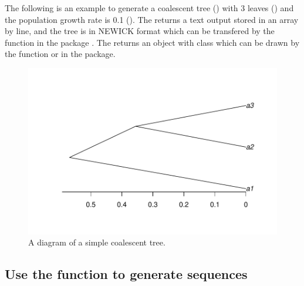 The following is an example to generate a coalescent tree ()
with 3 leaves ()
and the population growth rate is 0.1
(). The  returns a text output
stored in an array by line, and the tree is in NEWICK format which can
be transfered by the  function in the  package
\citep{Paradis2004}.
The  returns an object with class 
which can be drawn by the function  or 
in the  package.
\begin{figure}[h]
\begin{center}
\includegraphics[width=5.0in]{./phyclust-graph/ms}
\caption{A diagram of a simple coalescent tree.}
\label{fig:ms}
\end{center}
\end{figure}




\subsection[Use the seqgen() function to generate sequences]{Use the  function to generate sequences}
\label{sec:seqgen}

